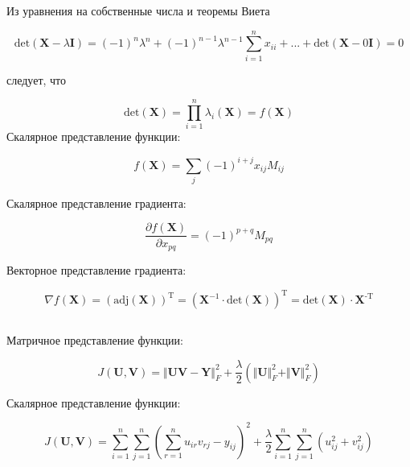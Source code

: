 	Из уравнения на собственные числа и теоремы Виета
	
	\begin{equation}
	\text{det}(\mathbf{X} - \lambda \mathbf{I}) = (-1)^n \lambda^n +(-1)^{n-1} \lambda^{n-1} \sum\limits_{i=1}^{n}x_{ii} + ... + \text{det} (\mathbf{X} - 0 \mathbf{I} )= 0
	\end{equation}
	
	следует, что 
	
	\begin{equation}
	\text{det} (\mathbf{X} )= \prod\limits_{i=1}^n \lambda_i  (\mathbf{X}) =
	f(\mathbf{X})
	\end{equation}
	Скалярное представление функции:
	
	\begin{equation}
	f(\mathbf{X}) = \sum_j (-1)^{i+j} x_{ij} M_{ij}
	\end{equation}
	
	Скалярное представление градиента:
	
	\begin{equation}
	\frac{\partial f(\mathbf{X}) }{\partial x_{pq}} = (-1)^{p+q}  M_{pq}
	\end{equation}
	
	Векторное представление градиента:
	
	\begin{equation}
	\nabla f(\mathbf{X})  = (\text{adj}(\mathbf{X}))^{\text{T}} =
	(\mathbf{X}^{-1}\cdot \text{det}(\mathbf{X}))^{\text{T}} =
	\text{det}(\mathbf{X}) \cdot\mathbf{X}^{\text{-T}}
	\end{equation}
	
	\subsection{}
	
	Матричное представление функции:
	
	\begin{equation}
	J(\mathbf{U}, \mathbf{V}) = \Vert \mathbf{U} \mathbf{V} - \mathbf{Y} \Vert_F^2
	+ \frac{\lambda}{2}(\Vert \mathbf{U} \Vert_F^2 + \Vert \mathbf{V}\Vert_F^2)
	\end{equation}
	
	Скалярное представление функции:
	
	\begin{equation}
	J(\mathbf{U}, \mathbf{V}) = \sum\limits_{i=1}^{n} \sum\limits_{j=1}^{n}
	(\sum\limits_{r=1}^{n}u_{ir}v_{rj}-y_{ij})^2 +
	\frac{\lambda}{2}\sum\limits_{i=1}^{n} \sum\limits_{j=1}^{n}(u_{ij}^2+v_{ij}^2)
	\end{equation}
	
